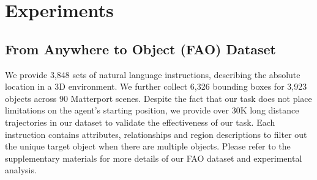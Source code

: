 \documentclass[final]{cvpr}
\begin{document}
\section{Experiments}


\begin{table*}[t]
\small
 \begin{center}
 \end{center}
 \vspace{-10pt}
 \caption{ The results of the GMSE and previous state-of-the-art methods on R2R (*: model uses additional synthetic data). }
 \vspace{-10pt}
 \label{table:result_r2r}
 \end{table*}

\subsection{From Anywhere to Object (FAO) Dataset}
We provide 3,848 sets of natural language instructions, describing the absolute location in a 3D environment. 
We further collect 6,326 bounding boxes for 3,923 objects across 90 Matterport scenes. Despite the fact that our task does not place limitations on the agent's starting position, we provide over 30K long distance trajectories in our dataset to validate the effectiveness of our task. 
Each instruction contains attributes, relationships and region descriptions to filter out the unique target object when there are multiple objects. 
Please refer to the supplementary materials for more details of our FAO dataset and experimental analysis. 
\end{document}
